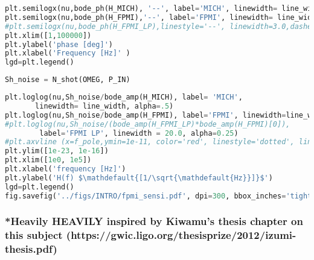 \begin{lstlisting}[frame=single, language=Python]
plt.semilogx(nu,bode_ph(H_MICH), '--', label='MICH', linewidth= line_width, alpha=.5)
plt.semilogx(nu,bode_ph(H_FPMI),'--', label='FPMI', linewidth= line_width)
#plt.semilogx(nu,bode_ph(H_FPMI_LP),linestyle='--', linewidth=3.0,dashes=(3,10))
plt.xlim([1,100000])
plt.ylabel('phase [deg]')
plt.xlabel('Frequency [Hz]' )
lgd=plt.legend()
\end{lstlisting}

\begin{lstlisting}[frame=single, language=Python]
Sh_noise = N_shot(OMEG, P_IN)
\end{lstlisting}

\begin{lstlisting}[frame=single, language=Python]
plt.loglog(nu,Sh_noise/bode_amp(H_MICH), label= 'MICH', 
	   linewidth= line_width, alpha=.5)
plt.loglog(nu,Sh_noise/bode_amp(H_FPMI), label='FPMI', linewidth=line_width)
#plt.loglog(nu,Sh_noise/(bode_amp(H_FPMI_LP)*bode_amp(H_FPMI)[0]), 
	    label='FPMI LP', linewidth = 20.0, alpha=0.25)
#plt.axvline (x=f_pole,ymin=1e-11, color='red', linestyle='dotted', linewidth=3)
plt.ylim([1e-23, 1e-16])
plt.xlim([1e0, 1e5])
plt.xlabel('frequency [Hz]')
plt.ylabel('H(f) $\mathdefault{[1/\sqrt{\mathdefault{Hz}}]}$')
lgd=plt.legend()
fig.savefig('../figs/INTRO/fpmi_sensi.pdf', dpi=300, bbox_inches='tight')
\end{lstlisting}

\hypertarget{heavily-heavily-inspired-by-kiwamus-thesis-chapter-on-this-subject-httpsgwic.ligo.orgthesisprize2012izumi-thesis.pdf}{%
\subsubsection{*Heavily HEAVILY inspired by Kiwamu's thesis chapter on
this subject
(https://gwic.ligo.org/thesisprize/2012/izumi-thesis.pdf)}\label{heavily-heavily-inspired-by-kiwamus-thesis-chapter-on-this-subject-httpsgwic.ligo.orgthesisprize2012izumi-thesis.pdf}}
